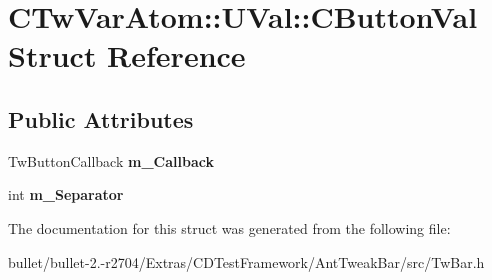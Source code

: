 \hypertarget{struct_c_tw_var_atom_1_1_u_val_1_1_c_button_val}{\section{C\+Tw\+Var\+Atom\+:\+:U\+Val\+:\+:C\+Button\+Val Struct Reference}
\label{struct_c_tw_var_atom_1_1_u_val_1_1_c_button_val}
}
\subsection*{Public Attributes}
\begin{DoxyCompactItemize}
\item 
\hypertarget{struct_c_tw_var_atom_1_1_u_val_1_1_c_button_val_a177dd9f16244281c1d1e8a6bce37544a}{Tw\+Button\+Callback {\bfseries m\+\_\+\+Callback}}\label{struct_c_tw_var_atom_1_1_u_val_1_1_c_button_val_a177dd9f16244281c1d1e8a6bce37544a}

\item 
\hypertarget{struct_c_tw_var_atom_1_1_u_val_1_1_c_button_val_a266852f085073984f8609144a4def426}{int {\bfseries m\+\_\+\+Separator}}\label{struct_c_tw_var_atom_1_1_u_val_1_1_c_button_val_a266852f085073984f8609144a4def426}

\end{DoxyCompactItemize}


The documentation for this struct was generated from the following file\+:\begin{DoxyCompactItemize}
\item 
bullet/bullet-\/2.-\/r2704/\+Extras/\+C\+D\+Test\+Framework/\+Ant\+Tweak\+Bar/src/Tw\+Bar.\+h\end{DoxyCompactItemize}
